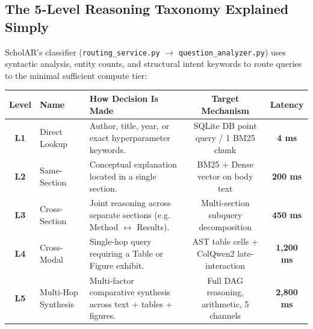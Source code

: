 \documentclass[11pt,a4paper]{article}
\begin{document}
\subsection{The 5-Level Reasoning Taxonomy Explained Simply}
ScholAR's classifier (\texttt{routing\_service.py} $\to$ \texttt{question\_analyzer.py}) uses syntactic analysis, entity counts, and structural intent keywords to route queries to the minimal sufficient compute tier:

\begin{center}
\small
\begin{tabular}{@{}clp{6.8cm}cc@{}}
\toprule
\textbf{Level} & \textbf{Name} & \textbf{How Decision Is Made} & \textbf{Target Mechanism} & \textbf{Latency} \\
\midrule
\textbf{L1} & Direct Lookup & Author, title, year, or exact hyperparameter keywords. & SQLite DB point query / 1 BM25 chunk & \textbf{4 ms} \\
\textbf{L2} & Same-Section & Conceptual explanation located in a single section. & BM25 + Dense vector on body text & \textbf{200 ms} \\
\textbf{L3} & Cross-Section & Joint reasoning across separate sections (e.g. Method $\leftrightarrow$ Results). & Multi-section subquery decomposition & \textbf{450 ms} \\
\textbf{L4} & Cross-Modal & Single-hop query requiring a Table or Figure exhibit. & AST table cells + ColQwen2 late-interaction & \textbf{1,200 ms} \\
\textbf{L5} & Multi-Hop Synthesis & Multi-factor comparative synthesis across text + tables + figures. & Full DAG reasoning, arithmetic, 5 channels & \textbf{2,800 ms} \\
\bottomrule
\end{tabular}
\end{center}
\end{document}
